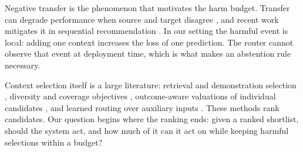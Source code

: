Negative transfer is the phenomenon that motivates the harm budget. Transfer
can degrade performance when source and target disagree
\citep{pan2010survey,torrey2010transfer,wang2019characterizing}, and recent
work mitigates it in sequential recommendation \citep{ant2025negative}. In our
setting the harmful event is local: adding one context increases the loss of
one prediction. The router cannot observe that event at deployment time, which
is what makes an abstention rule necessary.

Context selection itself is a large literature: retrieval and demonstration
selection \citep{brown2020language,min2022rethinking}, diversity and coverage
objectives \citep{carbonell1998use,gupta-etal-2023-coverage}, outcome-aware
valuations of individual candidates \citep{hashimoto-etal-2024-take}, and
learned routing over auxiliary inputs
\citep{jacobs1991adaptive,shazeer2017outrageously,rosenbaum2018routing}. These
methods rank candidates. Our question begins where the ranking ends: given a
ranked shortlist, should the system act, and how much of it can it act on
while keeping harmful selections within a budget?
